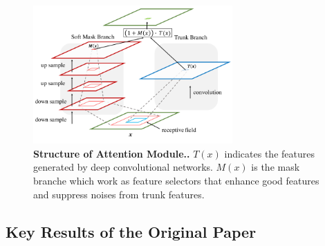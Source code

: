 \documentclass{article}
\newcommand{\mycaption}[2]{\caption[#1]{\textbf{#1.} #2}}
\begin{document}
\begin{multicols}{2}
\begin{figure}[H] 
\includegraphics[width=3in]{imgs/receptive_field.png}  
\mycaption{Structure of Attention Module.}{$T(x)$ indicates the features generated by deep convolutional networks. $M(x)$ is the mask branche which work as feature selectors that enhance good features and suppress noises from trunk features.}  
\label{fig:receptive_field}
\end{figure}

\subsection{Key Results of the Original Paper}

\end{multicols}
\end{document}
